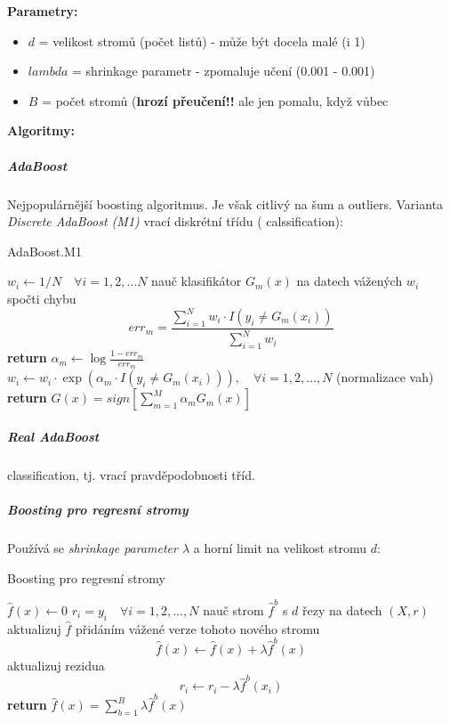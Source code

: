 \documentclass[11pt]{report} %
\numberwithin{equation}{section}
\begin{document}
\textbf{Parametry:}
\begin{itemize}
\item $d$ = velikost stromů (počet listů) - může být docela malé (i 1)
\item $lambda$ = shrinkage parametr - zpomaluje učení (0.001 - 0.001)
\item $B$ = počet stromů (\textbf{hrozí přeučení!! }ale jen pomalu, když vůbec
\end{itemize}

\textbf{Algoritmy:}
\subparagraph{AdaBoost}
Nejpopulárnější boosting algoritmus. Je však citlivý na šum a outliers. Varianta \textit{Discrete AdaBoost (M1)} vrací diskrétní třídu ( calssification):
\bigskip
\begin{algorithm}[H]
	\caption{AdaBoost.M1}
	\begin{algorithmic}[1]
		\State $w_i \gets 1/N \quad \forall i = 1,2, \dots N$ 
			\State nauč klasifikátor $G_m(x)$ na datech vážených $w_i$
			\State spočti chybu 
			$$err_m = \frac{\sum_{i=1}^{N} w_i\cdot I(y_i \neq G_m(x_i))}{\sum_{i=1}^{N} w_i}$$
				\State \textbf{return}
			\EndIf
			\State $\alpha_m \gets \log\frac{1 - err_m}{err_m}$
			\State $w_i \gets w_i \cdot \exp(\alpha_m \cdot I(y_i \neq G_m(x_i))),\quad \forall i = 1,2,\dots,N$ 
			\State (normalizace vah)
		\EndFor
		\State \textbf{return} $G(x) = sign\left[\sum_{m=1}^{M} \alpha_m G_m(x)\right]$
	\end{algorithmic}
\end{algorithm}		

\subparagraph{Real AdaBoost}
 classification, tj. vrací pravděpodobnosti tříd.
		
\subparagraph{Boosting pro regresní stromy}
Používá se \textit{shrinkage parameter $\lambda$} a horní limit na velikost stromu $d$:
\bigskip
\begin{algorithm}[H]
	\caption{Boosting pro regresní stromy}
	\begin{algorithmic}[1]
		\State $\hat{f}(x) \gets 0$
		\State $r_i = y_i \quad \forall i = 1,2,\dots,N$ 
			\State nauč strom $\hat{f}^b$ s $d$ řezy na datech $(X, r)$
			\State aktualizuj $\hat{f}$ přidáním vážené verze tohoto nového stromu
			$$\hat{f}(x) \gets \hat{f}(x) + \lambda\hat{f}^b(x)$$
			\State aktualizuj rezidua
			$$r_i \gets r_i - \lambda\hat{f}^b(x_i)$$
		\EndFor
		\State \textbf{return} $\hat{f}(x) =\sum_{b=1}^{B} \lambda \hat{f}^b(x)$
	\end{algorithmic}
\end{algorithm}		
\end{document}
